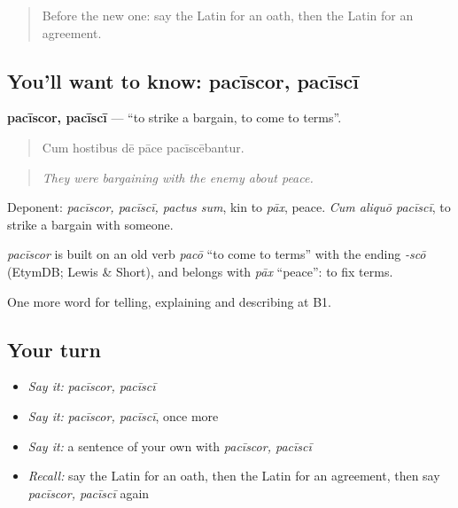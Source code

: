 \begin{quote}
Before the new one: say the Latin for an oath, then the Latin for an agreement.
\end{quote}

\subsection*{You'll want to know: pacīscor, pacīscī}
\textbf{pacīscor, pacīscī} — \textquotedblleft{}to strike a bargain, to come to terms\textquotedblright{}.

\begin{quote}
Cum hostibus dē pāce pacīscēbantur.
\end{quote}

\begin{quote}
\emph{They were bargaining with the enemy about peace.}
\end{quote}

Deponent: \emph{pacīscor, pacīscī, pactus sum}, kin to \emph{pāx}, peace. \emph{Cum aliquō pacīscī}, to strike a bargain with someone.

\begin{cousinweb}
\emph{pacīscor} is built on an old verb \emph{pacō} \textquotedblleft{}to come to terms\textquotedblright{} with the ending \emph{-scō} (EtymDB; Lewis \& Short), and belongs with \emph{pāx} \textquotedblleft{}peace\textquotedblright{}: to fix terms.
\end{cousinweb}

\begin{grammarlens}[title={What you've built}]
One more word for telling, explaining and describing at B1.
\end{grammarlens}

\subsection*{Your turn}
\begin{itemize}
\raggedright
  \item \emph{Say it:} \emph{pacīscor, pacīscī}
  \item \emph{Say it:} \emph{pacīscor, pacīscī}, once more
  \item \emph{Say it:} a sentence of your own with \emph{pacīscor, pacīscī}
  \item \emph{Recall:} say the Latin for an oath, then the Latin for an agreement, then say \emph{pacīscor, pacīscī} again
\end{itemize}

